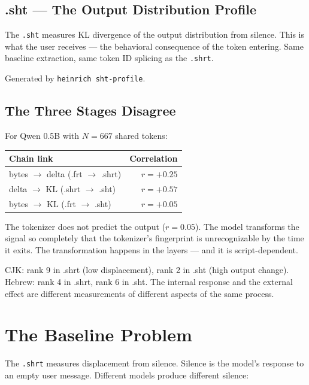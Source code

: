\documentclass[11pt,a4paper]{article}
\begin{document}
\subsection{.sht --- The Output Distribution Profile}

The \texttt{.sht} measures KL divergence of the output distribution from silence. This is what the user receives --- the behavioral consequence of the token entering. Same baseline extraction, same token ID splicing as the \texttt{.shrt}.

Generated by \texttt{heinrich sht-profile}.

\subsection{The Three Stages Disagree}

For Qwen 0.5B with $N = 667$ shared tokens:

\begin{center}
\begin{tabular}{lr}
\toprule
\textbf{Chain link} & \textbf{Correlation} \\
\midrule
bytes $\to$ delta (.frt $\to$ .shrt) & $r = +0.25$ \\
delta $\to$ KL (.shrt $\to$ .sht) & $r = +0.57$ \\
bytes $\to$ KL (.frt $\to$ .sht) & $r = +0.05$ \\
\bottomrule
\end{tabular}
\end{center}

The tokenizer does not predict the output ($r = 0.05$). The model transforms the signal so completely that the tokenizer's fingerprint is unrecognizable by the time it exits. The transformation happens in the layers --- and it is script-dependent.

CJK: rank 9 in .shrt (low displacement), rank 2 in .sht (high output change). Hebrew: rank 4 in .shrt, rank 6 in .sht. The internal response and the external effect are different measurements of different aspects of the same process.

\section{The Baseline Problem}

The \texttt{.shrt} measures displacement from silence. Silence is the model's response to an empty user message. Different models produce different silence:
\end{document}
